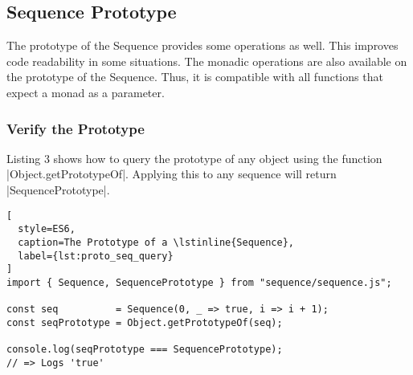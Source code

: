 \subsection{Sequence Prototype} %
\label{sub:Sequence Prototype}
The prototype of the Sequence provides some operations as well. This improves
code readability in some situations. The monadic operations are also available
on the prototype of the Sequence. Thus, it is compatible with all functions
that expect a monad as a parameter.

\subsubsection{Verify the Prototype} %
\label{subsub:Verify the Prototype}
Listing 3 shows how to query the prototype of any object using the function
|Object.getPrototypeOf|. Applying this to any sequence will return
|SequencePrototype|.


\begin{lstlisting}[
  style=ES6,
  caption=The Prototype of a \lstinline{Sequence},
  label={lst:proto_seq_query}
]
import { Sequence, SequencePrototype } from "sequence/sequence.js";

const seq          = Sequence(0, _ => true, i => i + 1);
const seqPrototype = Object.getPrototypeOf(seq);

console.log(seqPrototype === SequencePrototype);
// => Logs 'true'
\end{lstlisting}


